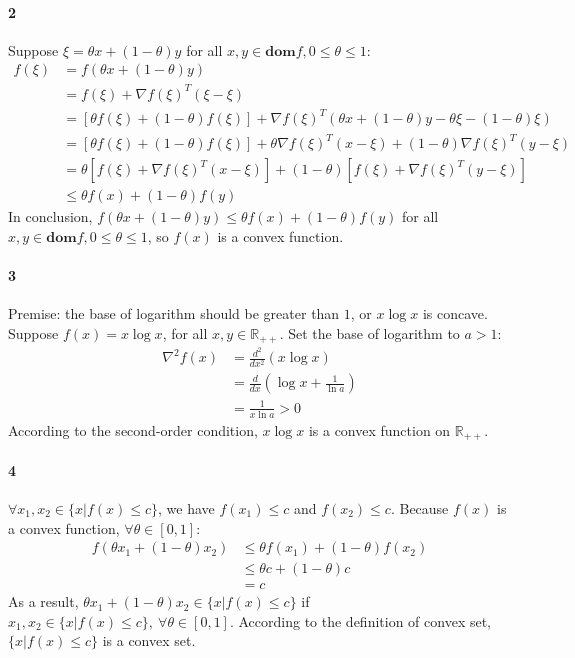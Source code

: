 \documentclass[22pt]{article}
\begin{document}
	\paragraph{2} Suppose $\xi = \theta x +(1-\theta)y$ for all $x,y \in \mathbf{dom}f, 0 \leq \theta \leq 1$:
	\begin{align}
		f(\xi) & =  f(\theta x + (1-\theta) y)\\
		& =  f(\xi) + \nabla f(\xi)^T(\xi-\xi)\\
		& =  [\theta f(\xi) +(1-\theta)f(\xi)]+ \nabla f(\xi)^T (\theta x +(1-\theta)y - \theta \xi-(1-\theta)\xi)\\
		& = [\theta f(\xi) +(1-\theta)f(\xi)] + \theta\nabla f(\xi)^T(x-\xi) + (1-\theta)\nabla f(\xi)^T(y-\xi)\\
		& = \theta[f(\xi) + \nabla f(\xi)^T(x-\xi)]+(1-\theta)[f(\xi)+\nabla f(\xi)^T(y-\xi)]\\
		& \leq \theta f(x) + (1-\theta)f(y)
	\end{align}
		In conclusion, $ f(\theta x + (1-\theta) y) \leq \theta f(x) + (1-\theta)f(y)$ for all $x,y \in \mathbf{dom}f, 0 \leq \theta \leq 1$, so $f(x)$ is a convex function.

	\paragraph{3} Premise: the base of logarithm should be greater than $1$, or $x\log x$ is concave.
	Suppose $f(x) = x\log x$, for all $x,y \in \mathbb{R}_{++}$. Set the base of logarithm to $a > 1$:
	\begin{align}
		\nabla^2 f(x) & = \frac{d^2}{dx^2}( x\log x)\\
		& = \frac{d}{dx} (\log x+\frac{1}{\ln a})\\
		& = \frac{1}{x\ln a}>0
	\end{align}
	According to the second-order condition, $x\log x$ is a convex function on $\mathbb{R_{++}}$.

	\paragraph{4} $\forall x_1,x_2 \in \{x|f(x)\leq c\}$, we have $f(x_1)\leq c$ and $f(x_2)\leq c$. Because $f(x)$ is a convex function, $ \forall \theta \in [0, 1]$:
	\begin{align}
		f(\theta x_1 + (1-\theta)x_2) & \leq \theta f(x_1) + (1-\theta)f(x_2)\\
		& \leq \theta c + (1-\theta)c\\
		& = c
	\end{align}
	As a result, $\theta x_1 + (1-\theta)x_2 \in \{x|f(x)\leq c\}$ if $ x_1,x_2 \in \{x|f(x)\leq c\}, \  \forall \theta \in [0, 1]$. According to the definition of convex set, $\{x|f(x)\leq c\}$ is a convex set.
\end{document}
